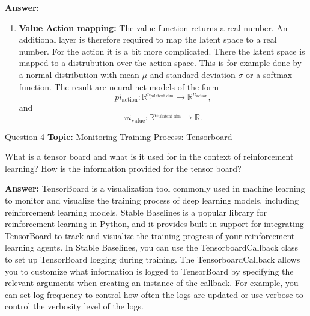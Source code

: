 \begin{frame}
    \textbf{Answer:}
    \begin{enumerate}[3.]
        \item \textbf{Value Action mapping:} The value function returns a real number. An additional layer is therefore required to map the latent space to a real number. For the action it is a bit more complicated. There the latent space is mapped to a distrubution over the action space. This is for example done by a normal distribution with mean $\mu$ and standard deviation $\sigma$ or a softmax function. The result are neural net models of the form
        \[pi_{\text{action}}: \mathbb{R}^{n_{pi \text{latent dim}}} \rightarrow \mathbb{R}^{n_{\text{action}}},\] and
        \[vi_{\text{value}}: \mathbb{R}^{n_{vi \text{latent dim}}} \rightarrow \mathbb{R}.\]
    \end{enumerate}
\end{frame}

\begin{frame}{Question 4}
    \textbf{Topic:} Monitoring Training Process: Tensorboard
    \vspace{10pt}

    What is a tensor board and what is it used for in the context of reinforcement learning? How is the information provided for the tensor board? 

    \vspace{20pt}

    \textbf{Answer:} TensorBoard is a visualization tool commonly used in machine learning to monitor and visualize the training process of deep learning models, including reinforcement learning models. Stable Baselines is a popular library for reinforcement learning in Python, and it provides built-in support for integrating TensorBoard to track and visualize the training progress of your reinforcement learning agents. In Stable Baselines, you can use the TensorboardCallback class to set up TensorBoard logging during training. The TensorboardCallback allows you to customize what information is logged to TensorBoard by specifying the relevant arguments when creating an instance of the callback. For example, you can set log frequency to control how often the logs are updated or use verbose to control the verbosity level of the logs.
\end{frame}

